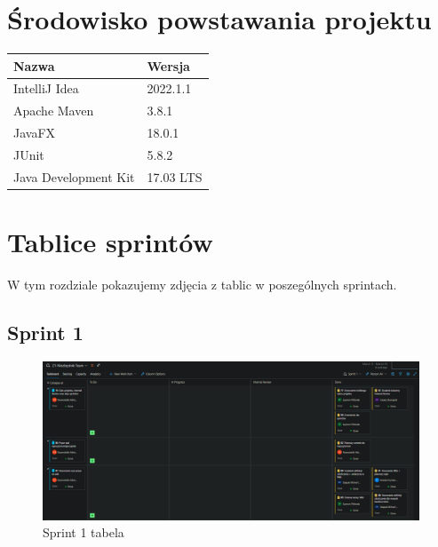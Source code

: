 \documentclass[10pt, a4paper]{report}
\begin{document}
\section{Środowisko powstawania projektu}
\begin{tabularx}{\textwidth}{ l|l } 
    \hline Nazwa & Wersja \\ 
    \hline IntelliJ Idea & 2022.1.1\\
    \hline Apache Maven & 3.8.1 \\ 
    \hline JavaFX & 18.0.1 \\
    \hline JUnit & 5.8.2\\
    \hline Java Development Kit & 17.03 LTS \\
    \hline
\end{tabularx}
\newpage

\section{Tablice sprintów}
W tym rozdziale pokazujemy zdjęcia z tablic w poszególnych sprintach.

\subsection{Sprint 1}
\begin{figure}[ht]
    \begin{center}
        \includegraphics[scale=0.38]{s1.png}
        \caption{Sprint 1 tabela}
    \end{center}
\end{figure}
\newpage
\end{document}
